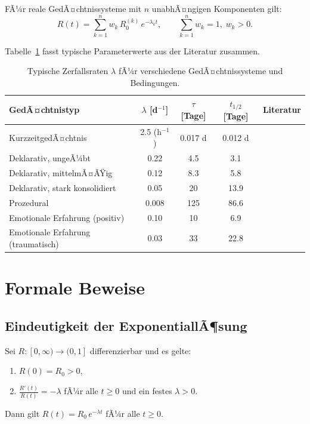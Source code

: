 ﻿\documentclass[12pt,a4paper,twoside]{article}
\theoremstyle{theormstyle}
\theoremstyle{proofstyle}
\begin{document}
	FÃ¼r reale GedÃ¤chtnissysteme mit $n$ unabhÃ¤ngigen Komponenten gilt:
	\begin{equation}
		R(t) = \sum_{k=1}^{n} w_k\,R_0^{(k)}\,e^{-\lambda_k t},
		\qquad \sum_{k=1}^{n} w_k = 1,\; w_k > 0.
		\label{eq:multiexp}
	\end{equation}
	
	Tabelle~\ref{tab:parameter} fasst typische Parameterwerte aus der Literatur zusammen.
	
	\begin{table}
		\centering
		\caption{Typische Zerfallsraten $\lambda$ fÃ¼r verschiedene GedÃ¤chtnissysteme und Bedingungen.}
		\label{tab:parameter}
		\begin{tabular}{lcccc}
			\toprule
			GedÃ¤chtnistyp & $\lambda$ [d$^{-1}$] & $\tau$ [Tage] & $t_{1/2}$ [Tage] & Literatur \\
			\midrule
			KurzzeitgedÃ¤chtnis & 2.5 \quad(h$^{-1}$) & 0.017 d & 0.012 d & \cite{atkinson1968human} \\
			Deklarativ, ungeÃ¼bt & 0.22 & 4.5 & 3.1 & \cite{ebbinghaus1885} \\
			Deklarativ, mittelmÃ¤ÃŸig & 0.12 & 8.3 & 5.8 & \cite{murre2015replication} \\
			Deklarativ, stark konsolidiert & 0.05 & 20 & 13.9 & \cite{wixted2004psychology} \\
			Prozedural & 0.008 & 125 & 86.6 & \cite{squire1992memory} \\
			Emotionale Erfahrung (positiv) & 0.10 & 10 & 6.9 & \cite{cahill1995amygdala} \\
			Emotionale Erfahrung (traumatisch) & 0.03 & 33 & 22.8 & \cite{mcgaugh2000memory} \\
			\bottomrule
		\end{tabular}
	\end{table}
	
	\section{Formale Beweise}
	\label{sec:beweise}
	
	\subsection{Eindeutigkeit der ExponentiallÃ¶sung}
	
		Sei $R : [0,\infty) \to (0,1]$ differenzierbar und es gelte:
		\begin{enumerate}[label=(\alph*)]
			\item $R(0) = R_0 > 0$,
			\item $\displaystyle\frac{R'(t)}{R(t)} = -\lambda$ fÃ¼r alle $t \geq 0$ und ein
			festes $\lambda > 0$.
		\end{enumerate}
		Dann gilt $R(t) = R_0\,e^{-\lambda t}$ fÃ¼r alle $t \geq 0$.
	
\end{document}
